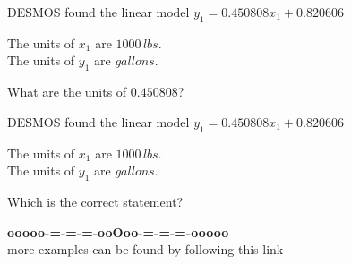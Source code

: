 \documentclass{ximera}
\begin{document}
\begin{question}


DESMOS found the linear model $y_1 = 0.450808 x_1 + 0.820606$ 


The units of $x_1$ are $1000 \, lbs$. \\
The units of $y_1$ are $gallons$.



What are the units of $0.450808$?

\begin{multipleChoice}
\end{multipleChoice}


\end{question}








\begin{question}


DESMOS found the linear model $y_1 = 0.450808 x_1 + 0.820606$ 


The units of $x_1$ are $1000 \, lbs$. \\
The units of $y_1$ are $gallons$.



Which is the correct statement?

\begin{multipleChoice}
\end{multipleChoice}


\end{question}




















\begin{center}
\textbf{\textcolor{green!50!black}{ooooo-=-=-=-ooOoo-=-=-=-ooooo}} \\

more examples can be found by following this link\\ 

\end{center}
\end{document}
